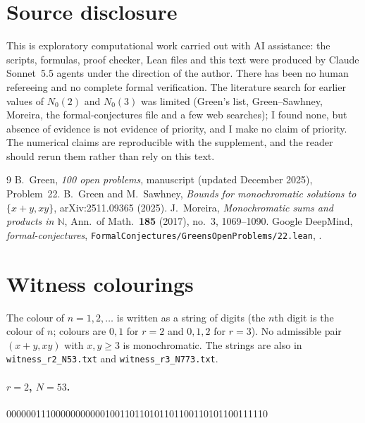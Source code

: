 \documentclass[11pt]{article}
\begin{document}
\section{Source disclosure}
This is exploratory computational work carried out with AI assistance: the scripts, formulas, proof checker, Lean files and this text were produced by Claude Sonnet~5.5 agents under the direction of the author. There has been no human refereeing and no complete formal verification. The literature search for earlier values of $N_0(2)$ and $N_0(3)$ was limited (Green's list, Green--Sawhney, Moreira, the formal-conjectures file and a few web searches); I found none, but absence of evidence is not evidence of priority, and I make no claim of priority. The numerical claims are reproducible with the supplement, and the reader should rerun them rather than rely on this text.

\begin{thebibliography}{9}
 B.~Green, \emph{100 open problems}, manuscript (updated December 2025), Problem~22. 
 B.~Green and M.~Sawhney, \emph{Bounds for monochromatic solutions to $\{x+y,xy\}$}, arXiv:2511.09365 (2025).
 J.~Moreira, \emph{Monochromatic sums and products in $\mathbb N$}, Ann.\ of Math.\ \textbf{185} (2017), no.~3, 1069--1090.
 Google DeepMind, \emph{formal-conjectures}, \texttt{FormalConjectures/GreensOpenProblems/22.lean}, .
\end{thebibliography}

\appendix
\section{Witness colourings}
The colour of $n=1,2,\dots$ is written as a string of digits (the $n$th digit is the colour of $n$; colours are $0,1$ for $r=2$ and $0,1,2$ for $r=3$). No admissible pair $(x+y,xy)$ with $x,y\ge3$ is monochromatic. The strings are also in \texttt{witness\_r2\_N53.txt} and \texttt{witness\_r3\_N773.txt}.

\paragraph{$r=2$, $N=53$.}
\begin{center}\ttfamily\small
00000011100000000000100110110101101100110101100111110
\end{center}
\end{document}
